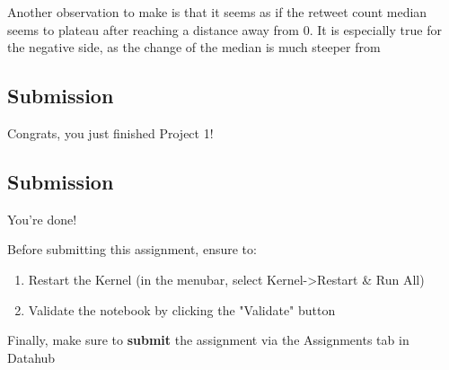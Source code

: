 \documentclass[11pt]{article}
\providecommand{\tightlist}{%
      \setlength{\itemsep}{0pt}\setlength{\parskip}{0pt}}
\begin{document}
Another observation to make is that it seems as if the retweet count
median seems to plateau after reaching a distance away from 0. It is
especially true for the negative side, as the change of the median is
much steeper from

    \subsection{Submission}\label{submission}

Congrats, you just finished Project 1!

    \subsection{Submission}\label{submission}

You're done!

Before submitting this assignment, ensure to:

\begin{enumerate}
\def\labelenumi{\arabic{enumi}.}
\tightlist
\item
  Restart the Kernel (in the menubar, select
  Kernel-\textgreater{}Restart \& Run All)
\item
  Validate the notebook by clicking the "Validate" button
\end{enumerate}

Finally, make sure to \textbf{submit} the assignment via the Assignments
tab in Datahub


    
    
    
    
\end{document}
